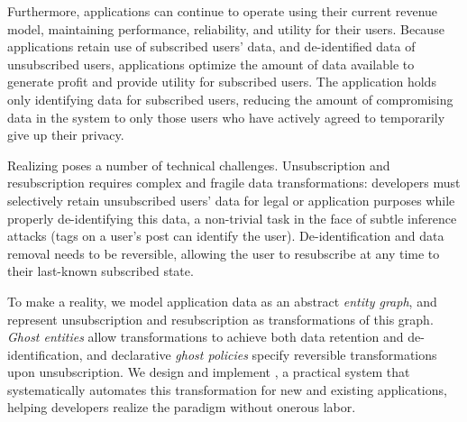 Furthermore, applications can continue to operate using their current revenue model, maintaining
performance, reliability, and utility for their users.  Because applications retain use of
subscribed users' data, and de-identified data of unsubscribed users, applications optimize the
amount of data available to generate profit and provide utility for subscribed users. The
application holds only identifying data for subscribed users, reducing the amount of
compromising data in the system to only those users who have actively agreed to temporarily give up
their privacy.

Realizing \name poses a number of technical challenges.
Unsubscription and resubscription requires complex and fragile data transformations: developers must
selectively retain unsubscribed users' data for legal or application purposes while properly
de-identifying this data, a non-trivial task in the face of subtle inference attacks (\eg tags on a
user's post can identify the user). De-identification and data removal needs to be reversible,
allowing the user to resubscribe at any time to their last-known subscribed state.

To make \name a reality, we model application data as an abstract \emph{entity graph}, and
represent unsubscription and resubscription as transformations of this graph.
\emph{Ghost entities} allow transformations to achieve both data retention and de-identification,
and declarative \emph{ghost policies} specify reversible transformations upon unsubscription.
We design and implement \sys, a practical system that systematically automates this transformation for new and existing applications, helping developers realize the \name paradigm without onerous labor.
\fi
